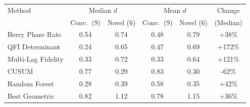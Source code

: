 \begin{tabular}{lccccc}
\toprule
Method & \multicolumn{2}{c}{Median $d$} & \multicolumn{2}{c}{Mean $d$} & Change \\
 & Conv.\ (9) & Novel (6) & Conv.\ (9) & Novel (6) & (Median) \\
\midrule
Berry Phase Rate          & 0.54 & 0.74 & 0.48 & 0.79 & +38\% \\
QFI Determinant           & 0.24 & 0.65 & 0.47 & 0.69 & +172\% \\
Multi-Lag Fidelity        & 0.33 & 0.72 & 0.33 & 0.64 & +121\% \\
CUSUM                     & 0.77 & 0.29 & 0.83 & 0.30 & -62\% \\
Random Forest             & 0.28 & 0.39 & 0.58 & 0.35 & +42\% \\
Best Geometric            & 0.82 & 1.12 & 0.78 & 1.15 & +36\% \\
\bottomrule
\end{tabular}

\medskip
{}